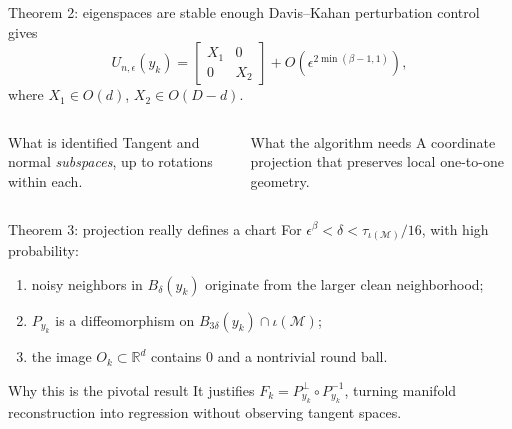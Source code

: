 \documentclass[aspectratio=169,10pt]{beamer}
\newcommand{\M}{\mathcal M}
\newcommand{\R}{\mathbb R}
\begin{document}
\begin{frame}{Theorem 2: eigenspaces are stable enough}
  Davis--Kahan perturbation control gives
  \[
    U_{n,\epsilon}(y_k)
      =
      \begin{bmatrix}X_1&0\\0&X_2\end{bmatrix}
      +O\!\left(\epsilon^{2\min(\beta-1,1)}\right),
  \]
  where \(X_1\in O(d)\), \(X_2\in O(D-d)\).
  \begin{columns}[T]
      \begin{block}{What is identified}
        Tangent and normal \emph{subspaces}, up to rotations within each.
      \end{block}
      \begin{exampleblock}{What the algorithm needs}
        A coordinate projection that preserves local one-to-one geometry.
      \end{exampleblock}
  \end{columns}
\end{frame}

\begin{frame}{Theorem 3: projection really defines a chart}
  For \(\epsilon^\beta<\delta<\tau_{\iota(\M)}/16\), with high probability:
  \begin{enumerate}
    \item noisy neighbors in \(B_\delta(y_k)\) originate from the larger clean neighborhood;
    \item \(P_{y_k}\) is a diffeomorphism on
      \(B_{3\delta}(y_k)\cap\iota(\M)\);
    \item the image \(O_k\subset\R^d\) contains \(0\) and a nontrivial round ball.
  \end{enumerate}
  \begin{alertblock}{Why this is the pivotal result}
    It justifies \(F_k=P^\perp_{y_k}\circ P_{y_k}^{-1}\), turning manifold
    reconstruction into regression without observing tangent spaces.
  \end{alertblock}
\end{frame}
\end{document}
